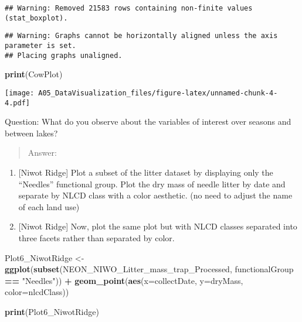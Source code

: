 \documentclass[
]{article}
\newenvironment{Shaded}{\begin{snugshade}}{\end{snugshade}}
\newcommand{\DataTypeTok}[1]{\textcolor[rgb]{0.13,0.29,0.53}{#1}}
\newcommand{\KeywordTok}[1]{\textcolor[rgb]{0.13,0.29,0.53}{\textbf{#1}}}
\newcommand{\NormalTok}[1]{#1}
\newcommand{\OperatorTok}[1]{\textcolor[rgb]{0.81,0.36,0.00}{\textbf{#1}}}
\newcommand{\StringTok}[1]{\textcolor[rgb]{0.31,0.60,0.02}{#1}}
\begin{document}
\begin{verbatim}
## Warning: Removed 21583 rows containing non-finite values (stat_boxplot).
\end{verbatim}

\begin{verbatim}
## Warning: Graphs cannot be horizontally aligned unless the axis parameter is set.
## Placing graphs unaligned.
\end{verbatim}

\begin{Shaded}
\begin{Highlighting}[]
\KeywordTok{print}\NormalTok{(CowPlot)}
\end{Highlighting}
\end{Shaded}

\texttt{[image: A05\_DataVisualization\_files/figure-latex/unnamed-chunk-4-4.pdf]}

Question: What do you observe about the variables of interest over
seasons and between lakes?

\begin{quote}
Answer:
\end{quote}

\begin{enumerate}
\def\labelenumi{\arabic{enumi}.}
\setcounter{enumi}{5}
\item
  {[}Niwot Ridge{]} Plot a subset of the litter dataset by displaying
  only the ``Needles'' functional group. Plot the dry mass of needle
  litter by date and separate by NLCD class with a color aesthetic. (no
  need to adjust the name of each land use)
\item
  {[}Niwot Ridge{]} Now, plot the same plot but with NLCD classes
  separated into three facets rather than separated by color.
\end{enumerate}

\begin{Shaded}
\begin{Highlighting}[]
\NormalTok{Plot6_NiwotRidge <-}\StringTok{ }\KeywordTok{ggplot}\NormalTok{(}\KeywordTok{subset}\NormalTok{(NEON_NIWO_Litter_mass_trap_Processed, }
\NormalTok{                                  functionalGroup }\OperatorTok{==}\StringTok{ "Needles"}\NormalTok{)) }\OperatorTok{+}
\StringTok{  }\KeywordTok{geom_point}\NormalTok{(}\KeywordTok{aes}\NormalTok{(}\DataTypeTok{x=}\NormalTok{collectDate, }\DataTypeTok{y=}\NormalTok{dryMass, }\DataTypeTok{color=}\NormalTok{nlcdClass))}

\KeywordTok{print}\NormalTok{(Plot6_NiwotRidge)}
\end{Highlighting}
\end{Shaded}
\end{document}
